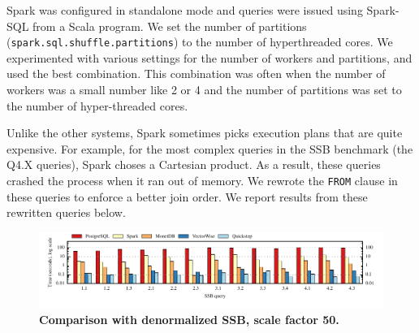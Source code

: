 Spark was configured in standalone mode and queries were issued using Spark-SQL from a Scala program. %
We set the number of partitions (\texttt{spark.sql.shuffle.partitions}) to the number of hyperthreaded cores. We experimented with various settings for the number of workers and partitions, and used the best combination. This combination was often when the number of workers was a small number like 2 or 4 and the number of partitions was set to the number of hyper-threaded cores. %

Unlike the other systems, Spark sometimes picks execution plans that are quite expensive. For example, for the most complex queries in the SSB benchmark (the Q4.X queries), Spark choses a Cartesian product. As a result, these queries crashed the process when it ran out of memory. We rewrote the \texttt{FROM} clause in these queries to enforce a better join order. We report results from these rewritten queries below.

\begin{figure}[htb]
\center
\includegraphics[]{system/figures/all-ssb-wt50.pdf}
\caption{\textbf{Comparison with denormalized SSB, scale factor 50.}}
\label{fig-ssb-sf50-widetable}
\end{figure}



